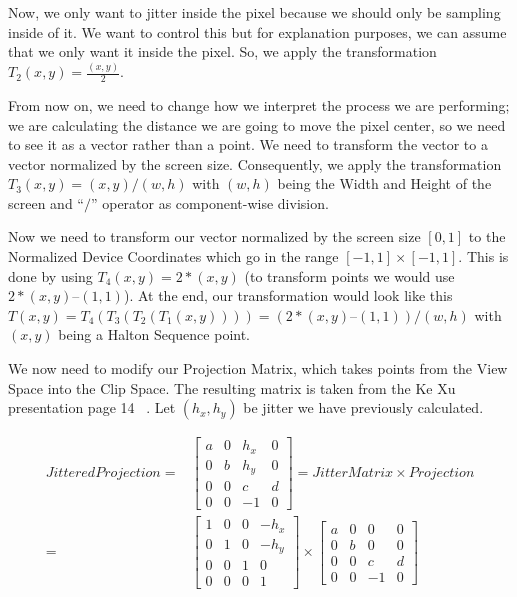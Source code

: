 \documentclass{cslthse-msc}
\begin{document}
\begin{appendices}
Now, we only want to jitter inside the pixel because we should only be sampling inside of it. We want to control this but for explanation purposes, we can assume that we only want it inside the pixel. So, we apply the transformation $T_2(x, y) = \frac{(x, y)}{2}$.

From now on, we need to change how we interpret the process we are performing; we are calculating the distance we are going to move the pixel center, so we need to see it as a vector rather than a point. We need to transform the vector to a vector normalized by the screen size. Consequently, we apply the transformation $T_3(x, y) = (x, y) / (w, h)$ with $(w, h)$ being the Width and Height of the screen and “$/$” operator as component-wise division.

Now we need to transform our vector normalized by the screen size $[0, 1]$ to the Normalized Device Coordinates which go in the range $[-1, 1]\times [-1, 1]$. This is done by using $T_4(x, y) = 2 * (x, y)$ (to transform points we would use $2*(x, y) – (1, 1)$).
At the end, our transformation would look like this $T(x, y) = T_4(T_3(T_2(T_1(x, y)))) = (2 * (x, y) – (1, 1)) / (w, h)$ with $(x, y)$ being a Halton Sequence point.

We now need to modify our Projection Matrix, which takes points from the View Space into the Clip Space. The resulting matrix is taken from the Ke Xu presentation page 14 ~\cite{XU2016}. Let $(h_x,h_y)$ be jitter we have previously calculated.

\begin{equation}
\begin{split}
JitteredProjection = & \begin{bmatrix*} 
a & 0 & h_x & 0 \\ 
0 & b & h_y & 0 \\
0 & 0 & c & d   \\
0 & 0 & -1 & 0   \end{bmatrix*} = JitterMatrix\times Projection \\
= & \begin{bmatrix*} 
1 & 0 & 0 & -h_x \\ 
0 & 1 & 0 & -h_y \\
0 & 0 & 1 & 0   \\
0 & 0 & 0 & 1   \end{bmatrix*} \times \begin{bmatrix*} 
a & 0 & 0 & 0 \\ 
0 & b & 0 & 0 \\
0 & 0 & c & d   \\
0 & 0 & -1 & 0   \end{bmatrix*}
\end{split}
\end{equation}


\end{appendices}
\end{document}
